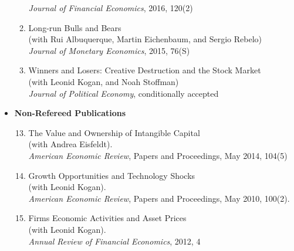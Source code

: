\documentclass[12pt,letterpaper,serif,overlapped]{res}
\begin{document}
\begin{resume}
\begin{itemize}
\begin{enumerate}
\emph{Journal of Financial Economics}, 2016, 120(2)
\item Long-run Bulls and Bears\\ (with Rui Albuquerque, Martin Eichenbaum, and Sergio Rebelo)\\
\emph{Journal of Monetary Economics}, 2015, 76(S)
\item Winners and Losers: Creative Destruction and the Stock Market\\ (with Leonid Kogan, and Noah Stoffman)\\\emph{Journal of Political Economy}, conditionally accepted
\end{enumerate}
\clearpage
\vspace{0.65cm}
\item \textbf{Non-Refereed Publications}
\begin{enumerate}
\setcounter{enumi}{12}
\item The Value and Ownership of Intangible Capital\\ (with Andrea Eisfeldt). \\
\emph{American Economic Review}, Papers and Proceedings, May 2014, 104(5)
\item Growth Opportunities and Technology Shocks\\ (with Leonid Kogan). \\
\emph{American Economic Review}, Papers and Proceedings, May 2010, 100(2).
\item Firms Economic Activities and Asset Prices\\ (with Leonid Kogan). \\
\emph{Annual Review of Financial Economics}, 2012, 4
\end{enumerate}


\end{itemize}
\end{resume}
\end{document}
